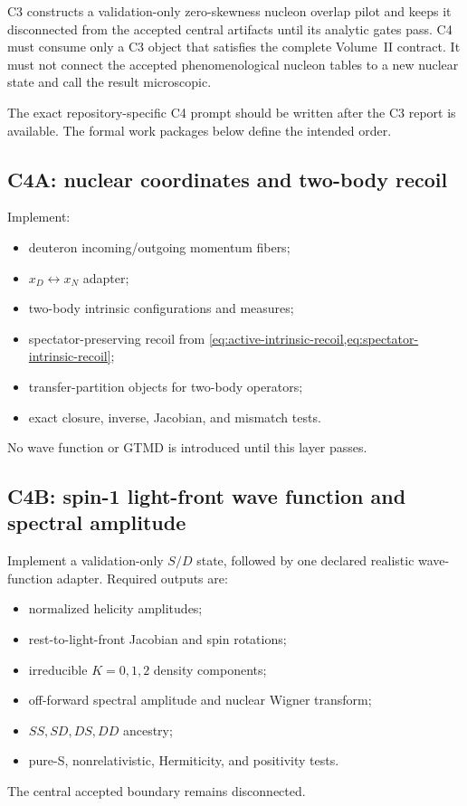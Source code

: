 \documentclass[11pt]{article}
\begin{document}
C3 constructs a validation-only zero-skewness nucleon overlap pilot and keeps
it disconnected from the accepted central artifacts until its analytic gates
pass.  C4 must consume only a C3 object that satisfies the complete Volume~II
contract.  It must not connect the accepted phenomenological nucleon tables to
a new nuclear state and call the result microscopic.

The exact repository-specific C4 prompt should be written after the C3 report
is available.  The formal work packages below define the intended order.

\subsection{C4A: nuclear coordinates and two-body recoil}

Implement:
\begin{itemize}
\item deuteron incoming/outgoing momentum fibers;
\item \(x_D\leftrightarrow x_N\) adapter;
\item two-body intrinsic configurations and measures;
\item spectator-preserving recoil from
      \cref{eq:active-intrinsic-recoil,eq:spectator-intrinsic-recoil};
\item transfer-partition objects for two-body operators;
\item exact closure, inverse, Jacobian, and mismatch tests.
\end{itemize}
No wave function or GTMD is introduced until this layer passes.

\subsection{C4B: spin-1 light-front wave function and spectral amplitude}

Implement a validation-only \(S/D\) state, followed by one declared realistic
wave-function adapter.  Required outputs are:
\begin{itemize}
\item normalized helicity amplitudes;
\item rest-to-light-front Jacobian and spin rotations;
\item irreducible \(K=0,1,2\) density components;
\item off-forward spectral amplitude and nuclear Wigner transform;
\item \(SS,SD,DS,DD\) ancestry;
\item pure-S, nonrelativistic, Hermiticity, and positivity tests.
\end{itemize}
The central accepted boundary remains disconnected.
\end{document}
